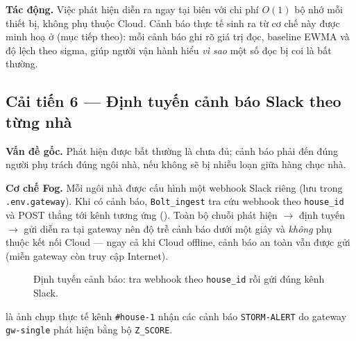 \documentclass[13pt,a4paper]{report}
\newcommand{\code}[1]{\texttt{\small #1}}
\begin{document}
\textbf{Tác động.} Việc phát hiện diễn ra ngay tại biên với chi phí $O(1)$ bộ nhớ
mỗi thiết bị, không phụ thuộc Cloud. Cảnh báo thực tế sinh ra từ cơ chế này được
minh hoạ ở  (mục tiếp theo): mỗi cảnh báo ghi rõ giá trị
đọc, baseline EWMA và độ lệch theo sigma, giúp người vận hành hiểu \textit{vì sao}
một số đọc bị coi là bất thường.

\subsection{Cải tiến 6 --- Định tuyến cảnh báo Slack theo từng nhà}

\textbf{Vấn đề gốc.} Phát hiện được bất thường là chưa đủ; cảnh báo phải đến đúng
người phụ trách đúng ngôi nhà, nếu không sẽ bị nhiễu loạn giữa hàng chục nhà.

\textbf{Cơ chế Fog.} Mỗi ngôi nhà được cấu hình một webhook Slack riêng (lưu trong
\code{.env.gateway}). Khi có cảnh báo, \code{Bolt\_ingest} tra cứu webhook theo
\code{house\_id} và POST thẳng tới kênh tương ứng ().
Toàn bộ chuỗi phát hiện $\to$ định tuyến $\to$ gửi diễn ra tại gateway nên độ trễ
cảnh báo dưới một giây và \textit{không} phụ thuộc kết nối Cloud --- ngay cả khi
Cloud offline, cảnh báo an toàn vẫn được gửi (miễn gateway còn truy cập Internet).

\begin{figure}[H]
\centering
{}
\caption{Định tuyến cảnh báo: tra webhook theo \code{house\_id} rồi gửi đúng kênh Slack.}
\label{fig:imp-slack-route}
\end{figure}

 là ảnh chụp thực tế kênh \code{\#house-1} nhận các cảnh báo
\code{STORM-ALERT} do gateway \code{gw-single} phát hiện bằng bộ \code{Z\_SCORE}.
\end{document}
